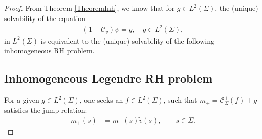 \documentclass[10pt,a4paper]{amsart}
\newcommand{\tv}{{\widetilde v}}
\newcommand{\Cau}{\mathcal C_{\Sigma}}
\newcommand{\Cautv}{\mathcal C_{\tv}}
\newcommand{\Ltwo}{L^2(\Sigma)}
\numberwithin{equation}{section}
\begin{document}
\begin{proof}
From Theorem \ref{TheoremInh}, we know that for $g \in \Ltwo$, the (unique) solvability of the equation
\begin{align}\label{SingIE}
(1-\Cautv)\psi = g, \quad g\in \Ltwo,
\end{align}
in $\Ltwo$ is equivalent to the (unique) solvability of the following inhomogeneous RH problem.

\subsection*{Inhomogeneous Legendre RH problem}
For a given $g \in \Ltwo$, one seeks an $f \in \Ltwo$, such that $m_\pm = \Cau^\pm(f)+g$ satisfies the jump relation:
\begin{align*}
 m_+(s) &= m_-(s) \tv(s), \qquad s \in \Sigma.
\end{align*}


\end{proof}
\end{document}
